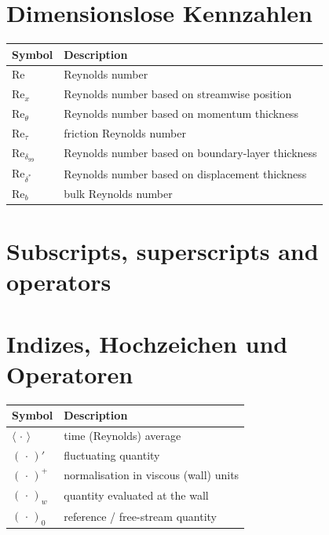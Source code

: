 \section*{Dimensionslose Kennzahlen}
\fi
\begin{longtable}[t]{@{}p{}p{}@{}}
    \textbf{Symbol} & \textbf{Description}\\
    \midrule
    \endhead
    $\mathrm{Re}$ & Reynolds number \\
    $\mathrm{Re}_x$ & Reynolds number based on streamwise position \\
    $\mathrm{Re}_\theta$ & Reynolds number based on momentum thickness \\
    $\mathrm{Re}_\tau$ & friction Reynolds number \\
    $\mathrm{Re}_{\delta_{99}}$ & Reynolds number based on boundary-layer thickness \\
    $\mathrm{Re}_{\delta^*}$ & Reynolds number based on displacement thickness \\
    $\mathrm{Re}_b$ & bulk Reynolds number \\
\end{longtable}

\ifenglish
\section*{Subscripts, superscripts and operators}
\else
\section*{Indizes, Hochzeichen und Operatoren}
\fi
\begin{longtable}[t]{@{}p{}p{}@{}}
    \textbf{Symbol} & \textbf{Description}\\
    \midrule
    \endhead
    $\langle\,\cdot\,\rangle$ & time (Reynolds) average \\
    $(\,\cdot\,)'$ & fluctuating quantity \\
    $(\,\cdot\,)^+$ & normalisation in viscous (wall) units \\
    $(\,\cdot\,)_w$ & quantity evaluated at the wall \\
    $(\,\cdot\,)_0$ & reference / free-stream quantity \\
\end{longtable}

\fi

\cleardoublepage
